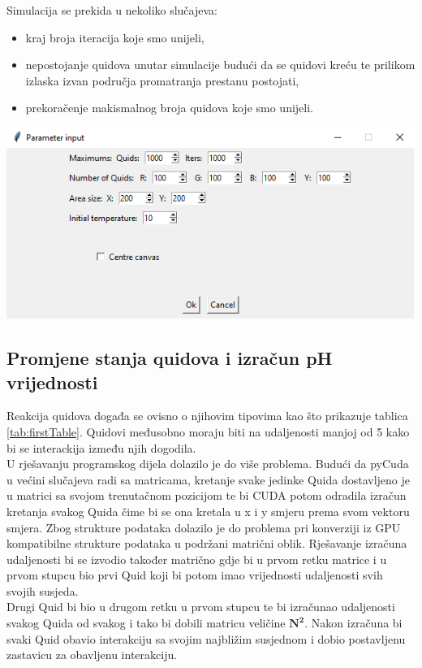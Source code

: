 \documentclass[12pt]{article}
\begin{document}
	Simulacija se prekida u nekoliko slučajeva:
	\begin{itemize}
		\item kraj broja iteracija koje smo unijeli,
		\item nepostojanje quidova unutar simulacije budući da se quidovi kreću te prilikom izlaska izvan područja promatranja prestanu postojati,
		\item prekoračenje makismalnog broja quidova koje smo unijeli.
	\end{itemize}
	
	\includegraphics[scale=0.75]{parametri.png}
	
	
	
	\subsection{Promjene stanja quidova i izračun pH vrijednosti}
	Reakcija quidova događa se ovisno o njihovim tipovima kao što prikazuje tablica \ref{tab:firstTable}. Quidovi međusobno moraju biti na udaljenosti manjoj od 5 kako bi se interackija između njih dogodila.\\
	U rješavanju programskog dijela dolazilo je do više problema. Budući da pyCuda u većini slučajeva radi sa matricama, kretanje svake jedinke Quida dostavljeno je u matrici sa svojom trenutačnom pozicijom te bi CUDA potom odradila izračun kretanja svakog Quida čime bi se ona kretala u x i y smjeru prema svom vektoru smjera.
	Zbog strukture podataka dolazilo je do problema pri konverziji iz GPU kompatibilne strukture podataka u podržani matrični oblik. 
	Rješavanje izračuna udaljenosti bi se izvodio također matrično gdje bi u prvom retku matrice  i u prvom stupcu bio prvi Quid koji bi potom imao vrijednosti udaljenosti svih svojih susjeda. \\
	Drugi Quid bi bio u drugom retku u prvom stupcu te bi izračunao udaljenosti svakog Quida od svakog i tako bi dobili matricu veličine $\mathbf{N^2}$.
	Nakon izračuna bi svaki Quid obavio interakciju sa svojim najbližim susjednom i dobio postavljenu zastavicu za obavljenu interakciju.
	
\end{document}
